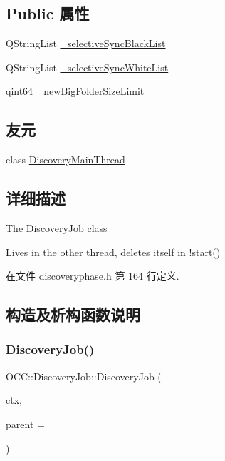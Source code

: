 \subsection*{Public 属性}
\begin{DoxyCompactItemize}
\item 
Q\+String\+List \hyperlink{class_o_c_c_1_1_discovery_job_afe69916308e0cb461568408e33283f47}{\+\_\+selective\+Sync\+Black\+List}
\item 
Q\+String\+List \hyperlink{class_o_c_c_1_1_discovery_job_af96bb82dc99b68055bb0f985ae10cdcd}{\+\_\+selective\+Sync\+White\+List}
\item 
qint64 \hyperlink{class_o_c_c_1_1_discovery_job_a530386caf4312005f713c39fbe7b7bd7}{\+\_\+new\+Big\+Folder\+Size\+Limit}
\end{DoxyCompactItemize}
\subsection*{友元}
\begin{DoxyCompactItemize}
\item 
class \hyperlink{class_o_c_c_1_1_discovery_job_acc5cac7c80f418cb21aaf62c81f80fae}{Discovery\+Main\+Thread}
\end{DoxyCompactItemize}


\subsection{详细描述}
The \hyperlink{class_o_c_c_1_1_discovery_job}{Discovery\+Job} class 

Lives in the other thread, deletes itself in !start() 

在文件 discoveryphase.\+h 第 164 行定义.



\subsection{构造及析构函数说明}
\mbox{\label{class_o_c_c_1_1_discovery_job_aa76b2b611b06516e17bd1ee1f55e4af9}} 
\subsubsection{\texorpdfstring{Discovery\+Job()}{DiscoveryJob()}}
{\footnotesize\ttfamily O\+C\+C\+::\+Discovery\+Job\+::\+Discovery\+Job (\begin{DoxyParamCaption}\item[{C\+S\+Y\+NC $\ast$}]{ctx,  }\item[{Q\+Object $\ast$}]{parent = {} }\end{DoxyParamCaption})\hspace{0.3cm}{\ttfamily [explicit]}}



